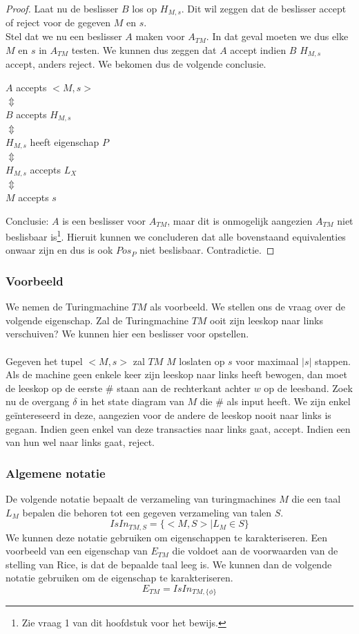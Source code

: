 \begin{proof}
	Laat nu de beslisser $B$ los op $H_{M,s}$. Dit wil zeggen dat de beslisser accept of reject voor de gegeven $M$ en $s$.\\
	Stel dat we nu een beslisser $A$ maken voor $A_{TM}$. In dat geval moeten we dus elke $M$ en $s$ in $A_{TM}$ testen. We kunnen dus zeggen dat $A$ accept indien $B$ $H_{M,s}$ accept, anders reject. We bekomen dus de volgende conclusie.
	\begin{center}
		$A$ accepts $<M,s>$\\
		$\Updownarrow$\\
		$B$ accepts $H_{M,s}$\\
		$\Updownarrow$\\
		$H_{M,s}$ heeft eigenschap $P$\\
		$\Updownarrow$\\
		$H_{M,s}$ accepts $L_X$\\
		$\Updownarrow$\\
		$M$ accepts $s$
	\end{center}
	Conclusie: $A$ is een beslisser voor $A_{TM}$, maar dit is onmogelijk aangezien $A_{TM}$ niet beslisbaar is\footnote{Zie vraag 1 van dit hoofdstuk voor het bewijs.}. Hieruit kunnen we concluderen dat alle bovenstaand equivalenties onwaar zijn en dus is  ook $Pos_P$ niet beslisbaar. Contradictie.
\end{proof}

\subsubsection*{Voorbeeld}

We nemen de Turingmachine $TM$ als voorbeeld. We stellen ons de vraag over de volgende eigenschap. Zal de Turingmachine $TM$ ooit zijn leeskop naar links verschuiven? We kunnen hier een beslisser voor opstellen.
\\\\
Gegeven het tupel $<M,s>$ zal $TM$ $M$ loslaten op $s$ voor maximaal $|s|$ stappen. Als de machine geen enkele keer zijn leeskop naar links heeft bewogen, dan moet de leeskop op de eerste $\#$ staan aan de rechterkant achter $w$ op de leesband. Zoek nu de overgang $\delta$ in het state diagram van $M$ die $\#$ als input heeft. We zijn enkel ge\"intereseerd in deze, aangezien voor de andere de leeskop nooit naar links is gegaan. Indien geen enkel van deze transacties naar links gaat, accept. Indien een van hun wel naar links gaat, reject.

\subsubsection*{Algemene notatie}

De volgende notatie bepaalt de verzameling van turingmachines $M$ die een taal $L_M$ bepalen die behoren tot een gegeven verzameling van talen $S$.
$$IsIn_{TM,S}=\{<M,S>|L_M \in S\}$$
We kunnen deze notatie gebruiken om eigenschappen te karakteriseren. Een voorbeeld van een eigenschap van $E_{TM}$ die voldoet aan de voorwaarden van de stelling van Rice, is dat de bepaalde taal leeg is. We kunnen dan de volgende notatie gebruiken om de eigenschap te karakteriseren.
$$E_{TM} = IsIn_{TM,\{\phi\}}$$
